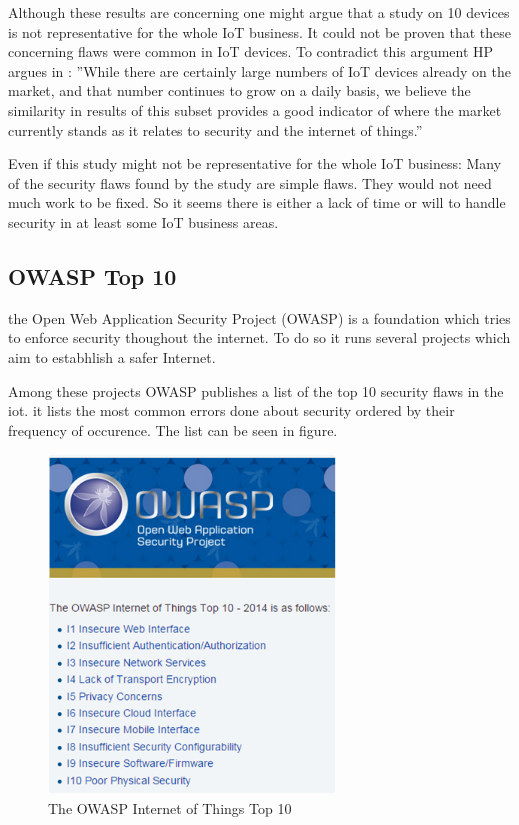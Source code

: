 \documentclass[conference]{IEEEtran}
\begin{document}
Although these results are concerning one might argue that a study on 10 
devices is not representative for the whole IoT business. It could not be 
proven that these concerning flaws were common in IoT devices. To contradict 
this argument HP argues in \cite[p. 6]{HPstudy}: ''While there are certainly 
large numbers of IoT devices already on the market, and that number continues 
to grow on a daily basis, we believe the similarity in results of this subset 
provides a good indicator of where the market currently stands as it relates to 
security and the internet of things.'' 

Even if this study might not be representative for the whole IoT business: Many 
of the security flaws found by the study are simple flaws. They would not need 
much work to be fixed. So it seems there is either a lack of time or will to 
handle security in at least some IoT business areas.

\subsection{OWASP Top 10}
the Open Web Application Security Project (OWASP) is a foundation which tries 
to enforce security thoughout the internet. To do so it runs several projects 
which aim to estabhlish a safer Internet. 

Among these projects OWASP publishes a list of the top 10 security flaws in the 
iot. it lists the most common errors done about security ordered by their 
frequency of occurence. The list can be seen in figure. 

\begin{figure}[!t]
\centering
\includegraphics[width=3.0in]{./img/owaspTop10.png}
\caption{The OWASP Internet of Things Top 10}
\label{owaspTop10}
\end{figure}
\end{document}
